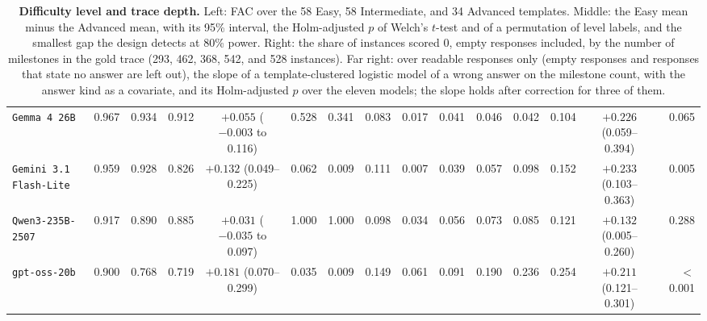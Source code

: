 \begin{table}[t]
{\begin{tabular}{l r r r c r r r r r r r r c r}
\texttt{Gemma 4 26B} & 0.967 & 0.934 & 0.912 & $+0.055$ ($-0.003$ to 0.116) & 0.528 & 0.341 & 0.083 & 0.017 & 0.041 & 0.046 & 0.042 & 0.104 & $+0.226$ (0.059--0.394) & 0.065 \\
\texttt{Gemini 3.1 Flash-Lite} & 0.959 & 0.928 & 0.826 & $+0.132$ (0.049--0.225) & 0.062 & 0.009 & 0.111 & 0.007 & 0.039 & 0.057 & 0.098 & 0.152 & $+0.233$ (0.103--0.363) & 0.005 \\
\texttt{Qwen3-235B-2507} & 0.917 & 0.890 & 0.885 & $+0.031$ ($-0.035$ to 0.097) & 1.000 & 1.000 & 0.098 & 0.034 & 0.056 & 0.073 & 0.085 & 0.121 & $+0.132$ (0.005--0.260) & 0.288 \\
\texttt{gpt-oss-20b} & 0.900 & 0.768 & 0.719 & $+0.181$ (0.070--0.299) & 0.035 & 0.009 & 0.149 & 0.061 & 0.091 & 0.190 & 0.236 & 0.254 & $+0.211$ (0.121--0.301) & $<$0.001 \\
\bottomrule
\end{tabular}
}
\caption{\textbf{Difficulty level and trace depth.} Left: FAC over the 58 Easy, 58 Intermediate, and
34 Advanced templates. Middle: the Easy mean minus the Advanced mean, with its 95\% interval, the
Holm-adjusted $p$ of Welch's $t$-test and of a permutation of level labels, and the smallest gap the
design detects at 80\% power. Right: the share of instances scored 0, empty responses included, by
the number of milestones in the gold trace (293, 462, 368, 542, and 528 instances). Far right: over
readable responses only (empty responses and responses that state no answer are left out), the slope
of a template-clustered logistic model of a wrong answer on the milestone count, with the answer
kind as a covariate, and its Holm-adjusted $p$ over the eleven models; the slope holds after
correction for three of them.}
\label{tab:level_gap}
\end{table}
